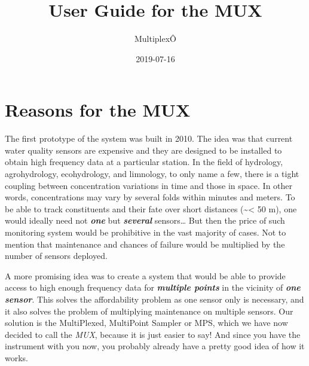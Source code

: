 \documentclass[]{book}
\title{User Guide for the MUX}
\author{MultiplexÔ}
\date{2019-07-16}
\begin{document}
\maketitle

{
\setcounter{tocdepth}{1}
\tableofcontents
}
\hypertarget{reasons-for-the-mux}{%
\chapter{Reasons for the MUX}\label{reasons-for-the-mux}}

The first prototype of the system was built in 2010. The idea was that current water quality sensors are expensive and they are designed to be installed to obtain high frequency data at a particular station. In the field of hydrology, agrohydrology, ecohydrology, and limnology, to only name a few, there is a tight coupling between concentration variations in time and those in space. In other words, concentrations may vary by several folds within minutes and meters. To be able to track constituents and their fate over short distances (\textasciitilde{}\textless{} 50 m), one would ideally need not \emph{\textbf{one}} but \emph{\textbf{several}} sensors\ldots{} But then the price of such monitoring system would be prohibitive in the vast majority of cases. Not to mention that maintenance and chances of failure would be multiplied by the number of sensors deployed.

A more promising idea was to create a system that would be able to provide access to high enough frequency data for \emph{\textbf{multiple points}} in the vicinity of \emph{\textbf{one sensor}}. This solves the affordability problem as one sensor only is necessary, and it also solves the problem of multiplying maintenance on multiple sensors. Our solution is the MultiPlexed, MultiPoint Sampler or MPS, which we have now decided to call the \emph{MUX}, because it is just easier to say! And since you have the instrument with you now, you probably already have a pretty good idea of how it works.
\end{document}
